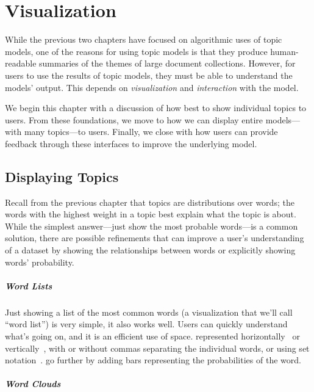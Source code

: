 \chapter{Visualization}
\label{ch:viz}

While the previous two chapters have focused on algorithmic uses of topic
models, one of the reasons for using topic models is that they produce
human-readable summaries of the themes of large document collections.  However,
for users to use the results of topic models, they must be able to understand
the models' output.  This depends on \emph{visualization} and \emph{interaction}
with the model.

We begin this chapter with a discussion of how best to show individual topics to
users.  From these foundations, we move to how we can display entire
models---with many topics---to users.  Finally, we close with how users can
provide feedback through these interfaces to improve the underlying model.

\section{Displaying Topics}
\label{sec:display}

Recall from the previous chapter that topics are distributions over words; the
words with the highest weight in a topic best explain what the topic is about.
While the simplest answer---just show the most probable words---is a common
solution, there are possible refinements that can improve a user's understanding
of a dataset by showing the relationships between words or explicitly showing
words' probability.

\paragraph{Word Lists}

Just showing a list of the most common words (a
visualization that we'll call ``word list'') is very simple, it also works well.
Users can quickly understand what's going on, and it is an efficient use of
space.  represented horizontally~\cite{gardner2010topic,smith2015visual} or
vertically~\cite{eisenstein2012topicviz,chaney2012visualizing}, with or without
commas separating the individual words, or using set
notation~\cite{chaney2012visualizing}.   go further by
adding bars representing the probabilities of the word.

\paragraph{Word Clouds}






